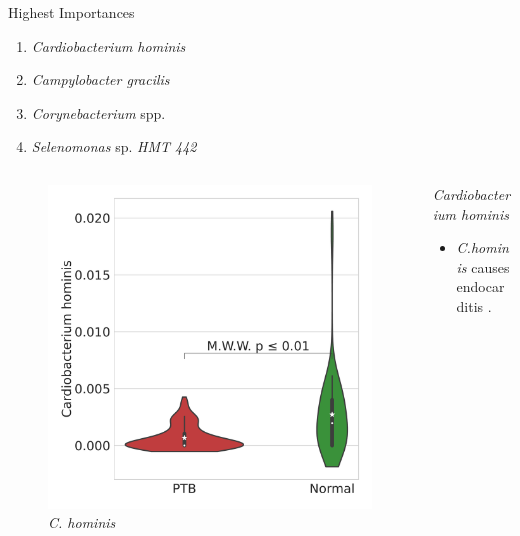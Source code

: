 \documentclass{beamer}
\begin{document}
\begin{frame}[allowframebreaks]
        \begin{block}{Highest Importances}
            \begin{enumerate}
                \item \textit{Cardiobacterium hominis}
                \item \textit{Campylobacter gracilis}
                \item \textit{Corynebacterium} spp.
                \item \textit{Selenomonas} sp. \textit{HMT 442}
            \end{enumerate}
        \end{block}
        \pagebreak

        \begin{columns}
            \begin{column}{0.4 \linewidth}
                \begin{figure}
                    \includegraphics[width=\linewidth]{figures/RandomForest_Proportion/singleton-RF.DADA2.homd.Mouth/Violin_0.pdf}
                    \caption{\textit{C. hominis}}
                \end{figure}
            \end{column}
            \begin{column}{0.6 \linewidth}
                \begin{block}{\textit{Cardiobacterium hominis}}
                    \begin{itemize}
                        \item \textit{C.hominis} causes endocarditis \cite{Cardiobacterium-1}.
                    \end{itemize}
                \end{block}
            \end{column}
        \end{columns}


\end{frame}
\end{document}
